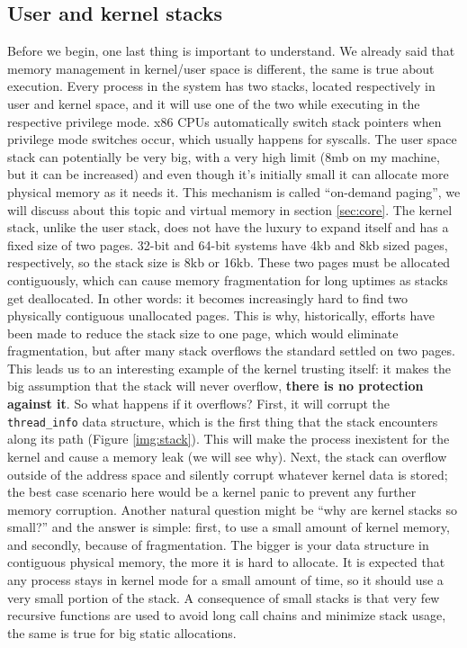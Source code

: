 \documentclass[10pt]{book}
\begin{document}
\subsection{User and kernel stacks} Before we begin, one last thing is important to understand. We already said that memory management in kernel/user space is different, the same is true about execution. Every process in the system has two stacks, located respectively in user and kernel space, and it will use one of the two while executing in the respective privilege mode. x86 CPUs automatically switch stack pointers when privilege mode switches occur, which usually happens for syscalls. The user space stack can potentially be very big, with a very high limit (8mb on my machine, but it can be increased) and even though it's initially small it can allocate more physical memory as it needs it. This mechanism is called ``on-demand paging'', we will discuss about this topic and virtual memory in section \ref{sec:core}. The kernel stack, unlike the user stack, does not have the luxury to expand itself and has a fixed size of two pages. 32-bit and 64-bit systems have 4kb and 8kb sized pages, respectively, so the stack size is 8kb or 16kb. These two pages must be allocated contiguously, which can cause memory fragmentation for long uptimes as stacks get deallocated. In other words: it becomes increasingly hard to find two physically contiguous unallocated pages. This is why, historically, efforts have been made to reduce the stack size to one page, which would eliminate fragmentation, but after many stack overflows the standard settled on two pages. This leads us to an interesting example of the kernel trusting itself: it makes the big assumption that the stack will never overflow, \textbf{there is no protection against it}. So what happens if it overflows? First, it will corrupt the \verb|thread_info| data structure, which is the first thing that the stack encounters along its path (Figure \ref{img:stack}). This will make the process inexistent for the kernel and cause a memory leak (we will see why). Next, the stack can overflow outside of the address space and silently corrupt whatever kernel data is stored; the best case scenario here would be a kernel panic to prevent any further memory corruption. Another natural question might be ``why are kernel stacks so small?'' and the answer is simple: first, to use a small amount of kernel memory, and secondly, because of fragmentation. The bigger is your data structure in contiguous physical memory, the more it is hard to allocate. It is expected that any process stays in kernel mode for a small amount of time, so it should use a very small portion of the stack. A consequence of small stacks is that very few recursive functions are used to avoid long call chains and minimize stack usage, the same is true for big static allocations. %
\end{document}
